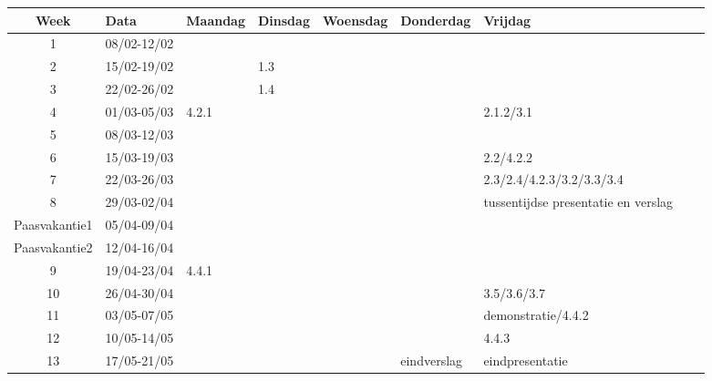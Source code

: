 \documentclass[landscape, 12pt]{article}
\begin{document}
	
	
	
	
			
		
		
		\begin{tabular}{|c|l||l|l|l|l|l|l|l|}
			\hline
			Week & Data & Maandag & Dinsdag & Woensdag & Donderdag & Vrijdag \\ \hline \hline
			1     &  08/02-12/02  &      &   & & &          \\ \hline
			2      &  15/02-19/02 &      &1.3& &&          \\ \hline      
			3      &22/02-26/02&      &    1.4     & &&          \\ \hline
			4     &01/03-05/03 & 4.2.1&  & &&2.1.2/3.1          \\ \hline
			
			5     &08/03-12/03&      &         & &&          \\ \hline
			6     &15/03-19/03 &      &         & &&2.2/4.2.2         \\ \hline
			7     &22/03-26/03 &      &         & & &2.3/2.4/4.2.3/3.2/3.3/3.4          \\ \hline
			8     &29/03-02/04&      &         & & &tussentijdse
			presentatie en verslag          \\ \hline
			
			Paasvakantie1     & 05/04-09/04&      &      & &&          \\ \hline
			
			Paasvakantie2     & 12/04-16/04 &      &     & &&         \\ \hline
			
			9     & 19/04-23/04 &4.4.1 &         & &&         \\ \hline
			10     &26/04-30/04 &      &         &&&3.5/3.6/3.7        \\ \hline
			11     &03/05-07/05 &      &         & & &demonstratie/4.4.2          \\ \hline
			12     &10/05-14/05 &      &  & &&4.4.3           \\ \hline
			13     &17/05-21/05 &      &         & &eindverslag&eindpresentatie
			         \\ \hline
		
		\end{tabular}
	
		
	
	
	
	
	
\end{document}
